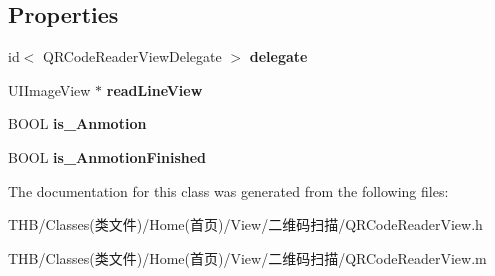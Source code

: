 \subsection*{Properties}
\begin{DoxyCompactItemize}
\item 
\mbox{\label{interface_q_r_code_reader_view_a52e6b76e776d815e56cc28fea60c13b5}} 
id$<$ Q\+R\+Code\+Reader\+View\+Delegate $>$ {\bfseries delegate}
\item 
\mbox{\label{interface_q_r_code_reader_view_ab767ffcedde9d2a813ddc3bea7070925}} 
U\+I\+Image\+View $\ast$ {\bfseries read\+Line\+View}
\item 
\mbox{\label{interface_q_r_code_reader_view_a460eb8a0502734b60972aac5736f1af3}} 
B\+O\+OL {\bfseries is\+\_\+\+Anmotion}
\item 
\mbox{\label{interface_q_r_code_reader_view_a40faa3826f3be7310eb2b3ae46997f4f}} 
B\+O\+OL {\bfseries is\+\_\+\+Anmotion\+Finished}
\end{DoxyCompactItemize}


The documentation for this class was generated from the following files\+:\begin{DoxyCompactItemize}
\item 
T\+H\+B/\+Classes(类文件)/\+Home(首页)/\+View/二维码扫描/Q\+R\+Code\+Reader\+View.\+h\item 
T\+H\+B/\+Classes(类文件)/\+Home(首页)/\+View/二维码扫描/Q\+R\+Code\+Reader\+View.\+m\end{DoxyCompactItemize}
